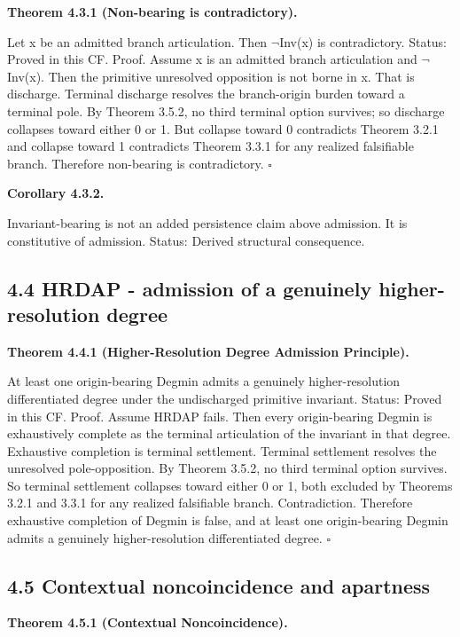 \documentclass[11pt]{article}
\begin{document}
\textbf{Theorem 4.3.1 (Non-bearing is contradictory).}

Let x be an admitted branch articulation. Then $\neg$Inv(x) is contradictory. Status: Proved in this CF. Proof. Assume x is an admitted branch articulation and $\neg$Inv(x). Then the primitive unresolved opposition is not borne in x. That is discharge. Terminal discharge resolves the branch-origin burden toward a terminal pole. By Theorem 3.5.2, no third terminal option survives; so discharge collapses toward either 0 or 1. But collapse toward 0 contradicts Theorem 3.2.1 and collapse toward 1 contradicts Theorem 3.3.1 for any realized falsifiable branch. Therefore non-bearing is contradictory. $\square$

\textbf{Corollary 4.3.2.}

Invariant-bearing is not an added persistence claim above admission. It is constitutive of admission. Status: Derived structural consequence.

\subsection{4.4 HRDAP - admission of a genuinely higher-resolution degree}\label{hrdap---admission-of-a-genuinely-higher-resolution-degree}

\textbf{Theorem 4.4.1 (Higher-Resolution Degree Admission Principle).}

At least one origin-bearing Degmin admits a genuinely higher-resolution differentiated degree under the undischarged primitive invariant. Status: Proved in this CF. Proof. Assume HRDAP fails. Then every origin-bearing Degmin is exhaustively complete as the terminal articulation of the invariant in that degree. Exhaustive completion is terminal settlement. Terminal settlement resolves the unresolved pole-opposition. By Theorem 3.5.2, no third terminal option survives. So terminal settlement collapses toward either 0 or 1, both excluded by Theorems 3.2.1 and 3.3.1 for any realized falsifiable branch. Contradiction. Therefore exhaustive completion of Degmin is false, and at least one origin-bearing Degmin admits a genuinely higher-resolution differentiated degree. $\square$

\subsection{4.5 Contextual noncoincidence and apartness}\label{contextual-noncoincidence-and-apartness}

\textbf{Theorem 4.5.1 (Contextual Noncoincidence).}
\end{document}
